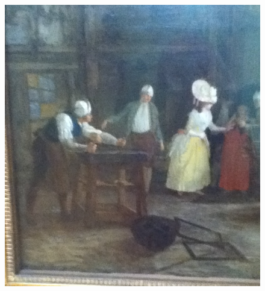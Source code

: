 \begin{figure}
\begin{minipage}[c]{.32\linewidth}
    \includegraphics[width=\textwidth]{figures/11J-4.JPG}
  \end{minipage}


\end{figure}
